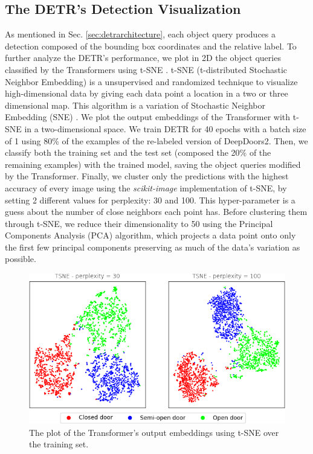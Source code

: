 \subsection{The DETR's Detection Visualization}
As mentioned in Sec. \ref{sec:detrarchitecture}, each object query produces a detection composed of the bounding box coordinates and the relative label. To further analyze the DETR's performance, we plot in 2D the object queries classified by the Transformers using t-SNE \cite{tsne}. t-SNE (t-distributed Stochastic Neighbor Embedding) is a unsupervised and randomized technique to visualize high-dimensional data by giving each data point a location in a two or three dimensional map. This algorithm is a variation of Stochastic Neighbor Embedding (SNE) \cite{sne}. We plot the output embeddings of the Transformer with t-SNE in a two-dimensional space. We train DETR for 40 epochs with a batch size of 1 using 80\% of the examples of the re-labeled version of DeepDoors2. Then, we classify both the training set and the test set (composed the 20\% of the remaining examples) with the trained model, saving the object queries modified by the Transformer. Finally, we cluster only the predictions with the highest accuracy of every image using the \textit{scikit-image} implementation of t-SNE, by setting 2 different values for perplexity: 30 and 100. This hyper-parameter is a guess about the number of close neighbors each point has. Before clustering them through t-SNE, we reduce their dimensionality to 50 using the Principal Components Analysis (PCA) \cite{pca} algorithm, which projects a data point onto only the first few principal components preserving as much of the data's variation as possible. 

\begin{figure}[h!]
	\centering
	\includegraphics[width=\linewidth]{images/deep_doors_2_tsne_trainset.png}
	\caption{The plot of the Transformer's output embeddings using t-SNE over the training set.}
	\label{fig:tsne_deep_doors2_train}
\end{figure}

